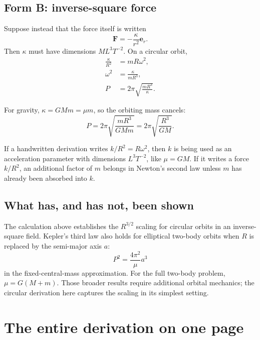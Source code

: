 \documentclass[11pt,a4paper]{article}
\newcommand{\er}{\bm e_r}
\newcommand{\FF}{\bm F}
\begin{document}
\clearpage

\subsection{Form B: inverse-square force}

Suppose instead that the force itself is written
\[
  \FF=-\frac{\kappa}{r^2}\er.
\]
Then $\kappa$ must have dimensions $ML^3T^{-2}$. On a circular orbit,
\begin{align*}
  \frac{\kappa}{R^2}&=mR\omega^2,\\
  \omega^2&=\frac{\kappa}{mR^3},\\
  P&=2\pi\sqrt{\frac{mR^3}{\kappa}}.
\end{align*}

For gravity, $\kappa=GMm=\mu m$, so the orbiting mass cancels:
\[
  P=2\pi\sqrt{\frac{mR^3}{GMm}}
   =2\pi\sqrt{\frac{R^3}{GM}}.
\]

\begin{idea}
If a handwritten derivation writes $k/R^2=R\omega^2$, then $k$ is being used as an acceleration parameter with dimensions $L^3T^{-2}$, like $\mu=GM$. If it writes a force $k/R^2$, an additional factor of $m$ belongs in Newton's second law unless $m$ has already been absorbed into $k$.
\end{idea}

\subsection{What has, and has not, been shown}

The calculation above establishes the $R^{3/2}$ scaling for circular orbits in an inverse-square field. Kepler's third law also holds for elliptical two-body orbits when $R$ is replaced by the semi-major axis $a$:
\[
  P^2=\frac{4\pi^2}{\mu}a^3
\]
in the fixed-central-mass approximation. For the full two-body problem, $\mu=G(M+m)$. Those broader results require additional orbital mechanics; the circular derivation here captures the scaling in its simplest setting.

\clearpage

\section{The entire derivation on one page}
\end{document}
